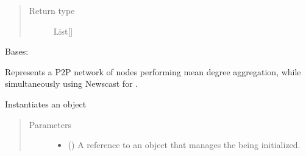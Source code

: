 \documentclass[letterpaper,10pt,english]{sphinxmanual}
\begin{document}
\begin{fulllineitems}
\begin{fulllineitems}
\begin{quote}
\begin{description}
\item[{Return type}] \leavevmode
List{[}{\hyperref[\detokenize{app:app.type_hints.NodeType}]{}}{]}

\end{description}\end{quote}

\end{fulllineitems}


\end{fulllineitems}


\begin{fulllineitems}
\label{\detokenize{app.domain:app.domain.cluster_groups.NewscastCluster}}
Bases: {\hyperref[\detokenize{app.domain:app.domain.cluster_groups.Cluster}]{}}

Represents a P2P network of nodes performing mean degree aggregation,
while simultaneously using Newscast for .

\begin{fulllineitems}
\label{\detokenize{app.domain:app.domain.cluster_groups.NewscastCluster.__init__}}
Instantiates an  object
\begin{quote}\begin{description}
\item[{Parameters}] \leavevmode\begin{itemize}
\item {} 
 ({\hyperref[\detokenize{app:app.type_hints.MasterType}]{}}) \textendash{} A reference to an {\hyperref[\detokenize{app.domain:app.domain.master_servers.Master}]{}}
object that manages the  being initialized.


\end{itemize}
\end{description}
\end{quote}
\end{fulllineitems}
\end{fulllineitems}
\end{document}
